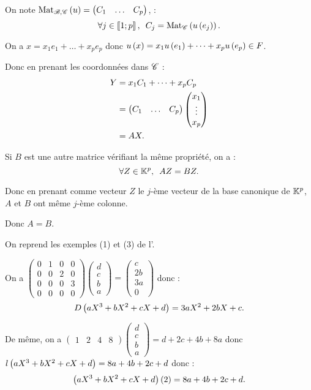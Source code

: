 \begin{dem}
On note \(\Mat[\fami{B},\fami{C}]{u}=\begin{pmatrix}C_1 & \dots & C_p\end{pmatrix}\), \cad : \[\quantifs{\forall j\in\interventierii{1}{p}}C_j=\Mat[\fami{C}]{u\paren{e_j}}.\]

On a \(x=x_1e_1+\dots+x_pe_p\) donc \(u\left(x\right)=x_1u\left(e_1\right)+\dots+x_pu\left(e_p\right)\in F\).

Donc en prenant les coordonnées dans \(\mathscr{C}\) : \[\begin{aligned}
Y&=x_1C_1+\dots+x_pC_p \\
&=\begin{pmatrix}C_1 & \dots & C_p\end{pmatrix}\begin{pmatrix}x_1\\\vdots\\x_p\end{pmatrix} \\
&=AX.
\end{aligned}\]

Si \(B\) est une autre matrice vérifiant la même propriété, on a : \[\quantifs{\forall Z\in\K^p}AZ=BZ.\]

Donc en prenant comme vecteur \(Z\) le \(j\)-ème vecteur de la base canonique de \(\mathbb{K}^p\), \(A\) et \(B\) ont même \(j\)-ème colonne.

Donc \(A=B\).
\end{dem}

\begin{ex}
On reprend les exemples (1) et (3) de l'.

On a \(\begin{pmatrix}
0 & 1 & 0 & 0 \\
0 & 0 & 2 & 0 \\
0 & 0 & 0 & 3 \\
0 & 0 & 0 & 0
\end{pmatrix}\begin{pmatrix}d \\ c \\ b \\ a\end{pmatrix}=\begin{pmatrix}c \\ 2b \\ 3a \\ 0\end{pmatrix}\) donc : \[D\left(aX^3+bX^2+cX+d\right)=3aX^2+2bX+c.\]

De même, on a \(\begin{pmatrix}1 & 2 & 4 & 8\end{pmatrix}\begin{pmatrix}d \\ c \\ b \\ a\end{pmatrix}=d+2c+4b+8a\) donc \(l\left(aX^3+bX^2+cX+d\right)=8a+4b+2c+d\) donc : \[\left(aX^3+bX^2+cX+d\right)\left(2\right)=8a+4b+2c+d.\]
\end{ex}

